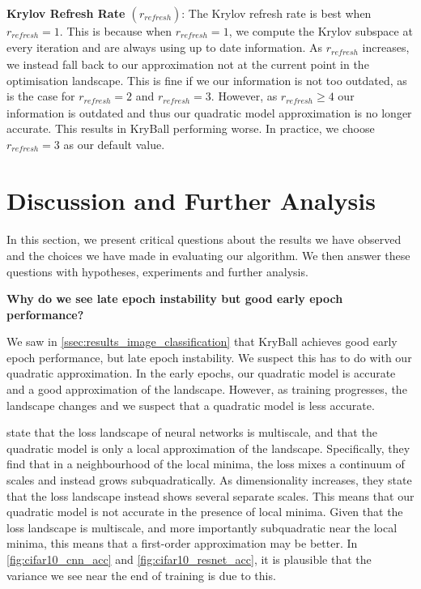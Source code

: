 \textbf{Krylov Refresh Rate $(r_{\mathit{refresh}})$}: The Krylov refresh rate is best when $r_{\mathit{refresh}} = 1$. This is because when $r_{\mathit{refresh}} = 1$, we compute the Krylov subspace at every iteration and are always using up to date information. As $r_{\mathit{refresh}}$ increases, we instead fall back to our approximation not at the current point in the optimisation landscape. This is fine if we our information is not too outdated, as is the case for $r_{\mathit{refresh}} = 2$ and $r_{\mathit{refresh}} = 3$. However, as $r_{\mathit{refresh}} \geq 4$ our information is outdated and thus our quadratic model approximation is no longer accurate. This results in KryBall performing worse. In practice, we choose $r_{\mathit{refresh}} = 3$ as our default value.

\section{Discussion and Further Analysis}
\label{sec:discussion_and_further_analysis}

In this section, we present critical questions about the results we have observed and the choices we have made in evaluating our algorithm. We then answer these questions with hypotheses, experiments and further analysis. 

\textbf{Why do we see late epoch instability but good early epoch performance?}

We saw in \cref{ssec:results_image_classification} that KryBall achieves good early epoch performance, but late epoch instability. We suspect this has to do with our quadratic approximation. In the early epochs, our quadratic model is accurate and a good approximation of the landscape. However, as training progresses, the landscape changes and we suspect that a quadratic model is less accurate. 

\cite{ma2022beyond} state that the loss landscape of neural networks is multiscale, and that the quadratic model is only a local approximation of the landscape. Specifically, they find that in a neighbourhood of the local minima, the loss mixes a continuum of scales and instead grows subquadratically. As dimensionality increases, they state that the loss landscape instead shows several separate scales. This means that our quadratic model is not accurate in the presence of local minima. Given that the loss landscape is multiscale, and more importantly subquadratic near the local minima, this means that a first-order approximation may be better. In \cref{fig:cifar10_cnn_acc} and \cref{fig:cifar10_resnet_acc}, it is plausible that the variance we see near the end of training is due to this. 

